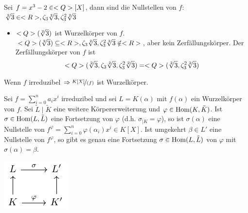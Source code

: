 \begin{*example}
	Sei $f = x^3 -2 \in <Q>[X]$, dann sind die Nullstellen von $f$: $\sqrt[2]{3} \in <R>, \zeta_3\sqrt[2]{3}, \zeta_3^2 \sqrt[2]{3}$
	\begin{itemize}
		\item $<Q>(\sqrt[2]{3})$ ist Wurzelkörper von $f$. $<Q>(\sqrt[2]{3}) \subseteq <R>, \zeta_3\sqrt[2]{3}, \zeta_3^2 \sqrt[2]{3} \notin <R>$, aber kein Zerfällungskörper. Der Zerfällungskörper von $f$ ist
		\begin{align*}
			<Q>(\sqrt[2]{3},\zeta_3\sqrt[2]{3}, \zeta_3^2 \sqrt[2]{3}) = <Q>(\sqrt[2]{3}, \zeta_3^2 \sqrt[2]{3})
		\end{align*}
	\end{itemize}
\end{*example}
\begin{*anmerkung}
	Wenn $f$ irreduzibel $\Rightarrow \lnkset{K[X]}{(f)}$ ist Wurzelkörper.
\end{*anmerkung}
\begin{lemma}
	Sei $f = \sum_{i=0}^n a_i x^i$ irreduzibel und sei $L = K(\alpha)$ mit $f(\alpha)$ ein Wurzelkörper von $f$. Sei $\tilde{L}\mid \tilde{K}$ eine weitere Körpererweiterung und $\varphi \in \operatorname{Hom}(K,\tilde{K})$. Ist $\sigma \in \operatorname{Hom}(L,\tilde{L})$ eine Fortsetzung von $\varphi$ (d.h. $\sigma_{\mid K} = \varphi$), so ist $\sigma(\alpha)$ eine Nullstelle von $f^{\varphi}=\sum_{i=0}^n \varphi(\alpha_i)x^i \in K[X]$. Ist umgekehrt $\beta \in L' $ eine Nullstelle von $f^{\varphi}$, so gibt es genau eine Fortsetzung $\sigma \in \operatorname{Hom}(L,\tilde{L})$ von $\varphi$ mit $\sigma(\alpha) = \beta$.
\begin{center} %
	\includegraphics{./tikz/lemma_1_3_12.pdf}
\end{center}
\end{lemma}
